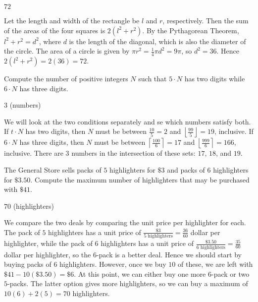 \documentclass[11pt]{article}
\begin{document}
\begin{answer}
$\boxed{72}$
\end{answer}

\begin{solution}
Let the length and width of the rectangle be $l$ and $r$, respectively. Then the sum of 
the areas of the four squares is $2(l^2 + r^2)$. By the Pythagorean Theorem,
$l^2 + r^2 = d^2$, where $d$ is the length of the diagonal, which is also the diameter
of the circle. The area of a circle is given by $\pi r^2 = \frac{1}{4}\pi d^2 = 9\pi$,
so $d^2 = 36$. Hence $2(l^2 + r^2) = 2(36) = \boxed{72}$.
\end{solution}


\begin{problem}%
Compute the number of positive integers $N$ such that $5 \cdot N$ has two digits while $6 \cdot N$ has three digits.
\end{problem}

\begin{answer}
$\boxed{3}$ (numbers)
\end{answer}

\begin{solution}
We will look at the two conditions separately and se which numbers satisfy both. If $t \cdot N$ has two digits,
then $N$ must be between $\frac{10}{5} = 2$ and $\left\lfloor \frac{99}{5} \right\rfloor = 19$, inclusive.
If $6 \cdot N$ has three digits, then $N$ must be between $\left\lceil \frac{100}{6} \right\rceil = 17$ and
$\left\lfloor \frac{999}{6} \right\rceil = 166$, inclusive. There are $\boxed{3}$ numbers in the intersection
of these sets: $17$, $18$, and $19$.
\end{solution}


\begin{problem}%
The General Store sells packs of $5$ highlighters for $\$3$ and packs of $6$ highlighters for $\$3.50$. 
Compute the maximum number of highlighters that may be purchased with $\$41$.
\end{problem}

\begin{answer}
$\boxed{70}$ (highlighters)
\end{answer}

\begin{solution}
We compare the two deals by comparing the unit price per highlighter for each.
The pack of $5$ highlighters has a unit price of $\frac{\$3}{5\text{ highlighters}} = \frac{36}{60}$ dollar per highlighter,
while the pack of $6$ highlighters has a unit price of $\frac{\$3.50}{6\text{ highlighters}} = \frac{35}{60}$ dollar per highlighter,
so the $6$-pack is a better deal.
Hence we should start by buying packs of $6$ highlighters. However, once we buy $10$ of these, we are left
with $\$41 - 10(\$3.50) = \$6$. At this point, we can either buy one more $6$-pack or two $5$-packs.
The latter option gives more highlighters, so we can buy a maximum of $10(6) + 2(5) = \boxed{70}$ highlighters.
\end{solution}
\end{document}

